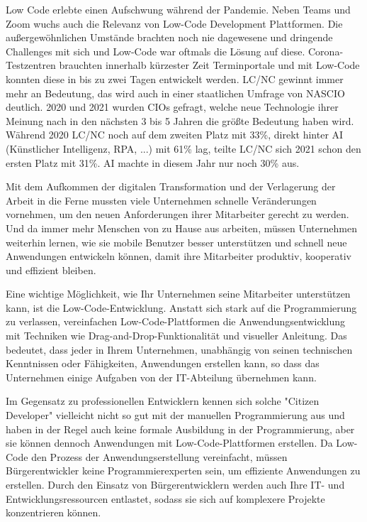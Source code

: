 \documentclass{article}
\begin{document}
	Low Code erlebte einen Aufschwung während der Pandemie. Neben Teams und Zoom wuchs auch die Relevanz von Low-Code Development Plattformen. Die außergewöhnlichen Umstände brachten noch nie dagewesene und dringende Challenges mit sich und Low-Code war oftmals die Lösung auf diese. Corona-Testzentren brauchten innerhalb kürzester Zeit Terminportale und mit Low-Code konnten diese in bis zu zwei Tagen entwickelt werden.
	\newline \newline 
	LC/NC gewinnt immer mehr an Bedeutung, das wird auch in einer staatlichen Umfrage von NASCIO deutlich. 2020 und 2021 wurden CIOs gefragt, welche neue Technologie ihrer Meinung nach in den nächsten 3 bis 5 Jahren die größte Bedeutung haben wird. Während 2020 LC/NC noch auf dem zweiten Platz mit 33\%, direkt hinter AI (Künstlicher Intelligenz, RPA, ...) mit 61\% lag, teilte LC/NC sich 2021 schon den ersten Platz mit 31\%. AI machte in diesem Jahr nur noch 30\% aus. 
	\cite{AmyGlasscock.2021}
	
	Mit dem Aufkommen der digitalen Transformation und der Verlagerung der Arbeit in die Ferne mussten viele Unternehmen schnelle Veränderungen vornehmen, um den neuen Anforderungen ihrer Mitarbeiter gerecht zu werden. Und da immer mehr Menschen von zu Hause aus arbeiten, müssen Unternehmen weiterhin lernen, wie sie mobile Benutzer besser unterstützen und schnell neue Anwendungen entwickeln können, damit ihre Mitarbeiter produktiv, kooperativ und effizient bleiben.
	
	Eine wichtige Möglichkeit, wie Ihr Unternehmen seine Mitarbeiter unterstützen kann, ist die Low-Code-Entwicklung. Anstatt sich stark auf die Programmierung zu verlassen, vereinfachen Low-Code-Plattformen die Anwendungsentwicklung mit Techniken wie Drag-and-Drop-Funktionalität und visueller Anleitung. Das bedeutet, dass jeder in Ihrem Unternehmen, unabhängig von seinen technischen Kenntnissen oder Fähigkeiten, Anwendungen erstellen kann, so dass das Unternehmen einige Aufgaben von der IT-Abteilung übernehmen kann.
	
	Im Gegensatz zu professionellen Entwicklern kennen sich solche "Citizen Developer" vielleicht nicht so gut mit der manuellen Programmierung aus und haben in der Regel auch keine formale Ausbildung in der Programmierung, aber sie können dennoch Anwendungen mit Low-Code-Plattformen erstellen. Da Low-Code den Prozess der Anwendungserstellung vereinfacht, müssen Bürgerentwickler keine Programmierexperten sein, um effiziente Anwendungen zu erstellen. Durch den Einsatz von Bürgerentwicklern werden auch Ihre IT- und Entwicklungsressourcen entlastet, sodass sie sich auf komplexere Projekte konzentrieren können.
	
\end{document}
